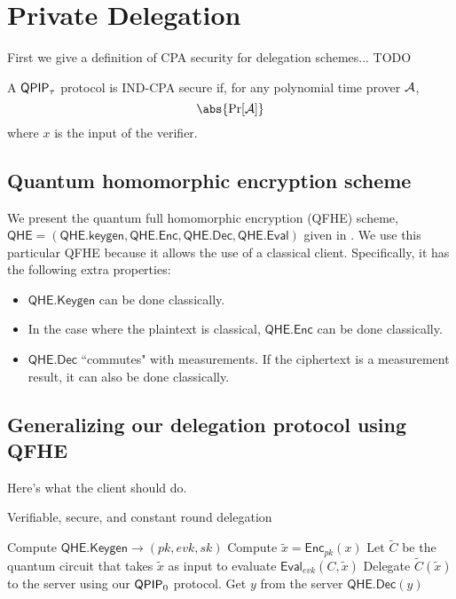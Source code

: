 \section{Private Delegation}


First we give a definition of CPA security for delegation schemes... TODO

\begin{dfn}
	A $\operatorname{\mathsf{QPIP}}_\tau$ protocol is IND-CPA secure if, for any polynomial time prover $\mathcal{A}$,
	$$\abs{\Pr[\cA]}$$
	where $x$ is the input of the verifier.
\end{dfn}

\subsection{Quantum homomorphic encryption scheme}


We present the quantum full homomorphic encryption (QFHE) scheme, $\mathsf{QHE}=(\mathsf{QHE.keygen}, \mathsf{QHE.Enc}, \mathsf{QHE.Dec}, \mathsf{QHE.Eval})$ given in \cite{mahadev_qfhe}. We use this particular QFHE because it allows the use of a classical client. Specifically, it has the following extra properties:
\begin{itemize}
	\item $\mathsf{QHE.Keygen}$ can be done classically.
	\item In the case where the plaintext is classical, $\mathsf{QHE.Enc}$ can be done classically.
	\item $\mathsf{QHE.Dec}$ ``commutes" with measurements.  If the ciphertext is a measurement result, it can also be done classically.
\end{itemize}

\subsection{Generalizing our delegation protocol using QFHE}


Here's what the client should do.

\begin{algorithm}
	\caption{Verifiable, secure, and constant round delegation}
	\label{ProtoPrivateDelegation}
	\begin{algorithmic}[1]
			\State Compute $\mathsf{QHE.Keygen}\rightarrow(pk, evk, sk)$
			\State Compute $\tilde{x}=\mathsf{Enc}_{pk}(x)$
			\State Let $\tilde{C}$ be the quantum circuit that takes $\tilde{x}$ as input to evaluate $\mathsf{Eval}_{evk}(C, \tilde{x})$
			\State Delegate $\tilde{C}(\tilde{x})$ to the server using our $\operatorname{\mathsf{QPIP}}_0$ protocol.
			\State Get $y$ from the server
			\State \Return $\mathsf{QHE.Dec}(y)$
		\EndProcedure
	\end{algorithmic}
\end{algorithm}


